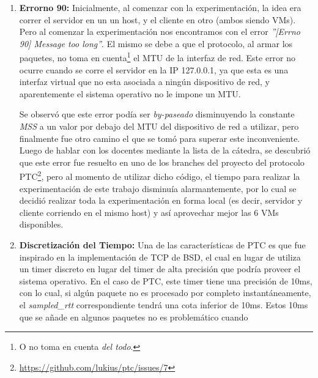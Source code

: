 \begin{enumerate}[label=(\alph*)]

    \item \textbf{Errorno 90:} Inicialmente, al comenzar con la
        experimentaci\'on, la idea era correr el servidor en un un host, y el
        cliente en otro (ambos siendo VMs). Pero al comenzar la
        experimentaci\'on nos encontramos con el error \emph{''[Errno 90]
        Message too long''}. El mismo se debe a que el protocolo, al armar los
        paquetes, no toma en cuenta\footnote{O no toma en cuenta \emph{del
        todo}.} el MTU de la interfaz de red. Este error no ocurre cuando se
        corre el servidor en la IP 127.0.0.1, ya que esta es una interfaz
        virtual que no esta asociada a ning\'un dispositivo de red, y
        aparentemente el sistema operativo no le impone un MTU.

        \par Se observ\'o que este error pod\'ia ser \emph{by-paseado}
        disminuyendo la constante \emph{MSS} a un valor por debajo del MTU del
        dispositivo de red a utilizar, pero finalmente fue otro camino el que se
        tom\'o para superar este inconveniente. Luego de hablar con los docentes
        mediante la lista de la c\'atedra, se descubri\'o que este error fue
        resuelto en uno de los branches del proyecto del protocolo
        PTC\footnote{\url{https://github.com/lukius/ptc/issues/7}}, pero al
        momento de utilizar dicho c\'odigo, el tiempo para realizar la
        experimentaci\'on de este trabajo disminu\'ia alarmantemente, por lo
        cual se decidi\'o realizar toda la experimentaci\'on en forma local (es
        decir, servidor y cliente corriendo en el mismo host) y as\'i aprovechar
        mejor las 6 VMs disponibles.

    \bigskip
    \item \textbf{Discretizaci\'on del Tiempo:} Una de las caracter\'isticas de
        PTC es que fue inspirado en la implementaci\'on de TCP de BSD\cite{bsd},
        el cual en lugar de utiliza un timer discreto en lugar del timer de alta
        precisi\'on que podr\'ia proveer el sistema operativo. En el caso de
        PTC, este timer tiene una precisi\'on de 10ms, con lo cual, si alg\'un
        paquete no es procesado por completo instant\'aneamente, el
        \emph{sampled\_rtt} correspondiente tendr\'a una cota inferior de 10ms.
        Estos 10ms que se a\~nade en algunos paquetes no es problem\'atico
        cuando
        \begin{enumerate*}[label=\itshape\arabic*\upshape)]


\end{enumerate*}
\end{enumerate}
